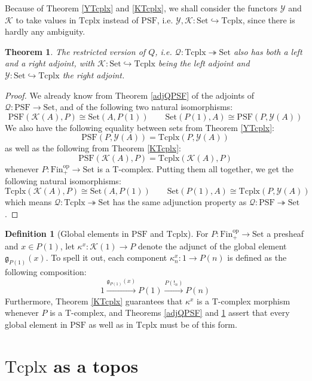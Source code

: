 \documentclass{article}
\newtheorem{theorem}{Theorem}[subsection]
\theoremstyle{remark}
\theoremstyle{definition}
\newtheorem{definition}{Definition}[subsection]
\newcommand{\Fin}{\mathrm{Fin}}
\newcommand{\Set}{\mathrm{Set}}
\newcommand{\PSF}{\mathrm{PSF}}
\newcommand{\op}{\mathrm{op}}
\newcommand{\Y}{\mathcal Y}
\newcommand{\K}{\mathcal K}
\newcommand{\g}{\mathfrak g}
\newcommand{\Tcplx}{\mathrm{Tcplx}}
\newcommand{\Q}{\mathcal Q}
\begin{document}
	Because of Theorem \ref{YTcplx} and \ref{KTcplx}, we shall consider the functors $\Y$ and $\K$ to take values in $\Tcplx$ instead of $\PSF$, i.e. $\Y,\K:\Set\hookrightarrow\Tcplx$, since there is hardly any ambiguity.
	\begin{theorem}\label{adjQT}
		The restricted version of $Q$, i.e. $\Q:\Tcplx\twoheadrightarrow\Set$ also has both a left and a right adjoint, with $\K:\Set\hookrightarrow\Tcplx$ being the left adjoint and $\Y:\Set\hookrightarrow\Tcplx$ the right adjoint.
	\end{theorem}
	\begin{proof}
		We already know from Theorem \ref{adjQPSF} of the adjoints of $\Q:\PSF\to\Set$, and of the following two natural isomorphisms:
		\[\PSF(\K(A),P)\cong\Set(A,P(1))\qquad\Set(P(1),A)\cong\PSF(P,\Y(A))\]
		We also have the following equality between sets from Theorem \ref{YTcplx}:
		\[\PSF(P,\Y(A))=\Tcplx(P,\Y(A))\]
		as well as the following from Theorem \ref{KTcplx}:
		\[\PSF(\K(A),P)=\Tcplx(\K(A),P)\]
		whenever $P:\Fin_+^\op\to\Set$ is a T-complex. Putting them all together, we get the following natural isomorphisms:
		\[\Tcplx(\K(A),P)\cong\Set(A,P(1))\qquad\Set(P(1),A)\cong\Tcplx(P,\Y(A))\]
		which means $\Q:\Tcplx\twoheadrightarrow\Set$ has the same adjunction property as $\Q:\PSF\twoheadrightarrow\Set$.
	\end{proof}
	\begin{definition}[Global elements in $\PSF$ and $\Tcplx$]
		For $P:\Fin_+^\op\to\Set$ a presheaf and $x\in P(1)$, let $\kappa^x:\K(1)\to P$ denote the adjunct of the global element $\g_{P(1)}(x)$. To spell it out, each component $\kappa^x_n:1\to P(n)$ is defined as the following composition:
		\[1\xrightarrow{\g_{P(1)}(x)}P(1)\xrightarrow{P(!_n)}P(n)\]
		Furthermore, Theorem \ref{KTcplx} guarantees that $\kappa^x$ is a T-complex morphism whenever $P$ is a T-complex, and Theorems \ref{adjQPSF} and \ref{adjQT} assert that every global element in $\PSF$ as well as in $\Tcplx$ must be of this form.
	\end{definition}
	\section{$\Tcplx$ as a topos}
\end{document}
